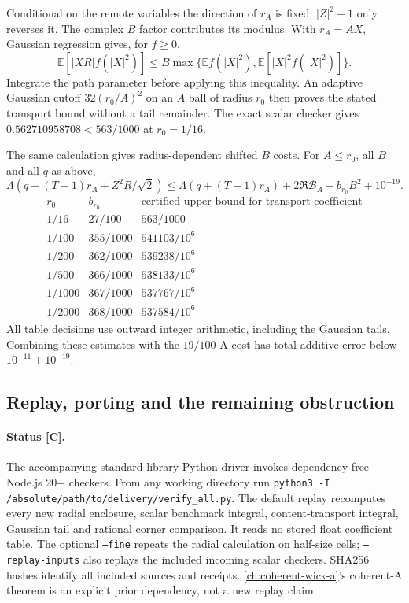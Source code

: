 Conditional on the remote variables the direction of $r_A$ is fixed;
$|Z|^2-1$ only reverses it. The complex $B$ factor contributes its
modulus. With $r_A=AX$, Gaussian regression gives, for $f\ge0$,
\[
 \mathbb E[|XR|f(|X|^2)]
 \le B\max\{\mathbb Ef(|X|^2),\mathbb E[|X|^2f(|X|^2)]\}.
\]
Integrate the path parameter before applying this inequality. An
adaptive Gaussian cutoff $32(r_0/A)^2$ on an $A$ ball of radius $r_0$
then proves the stated transport bound without a tail remainder.
The exact scalar checker gives $0.562710958708<563/1000$ at $r_0=1/16$.

The same calculation gives radius-dependent shifted $B$ costs. For
$A\le r_0$, all $B$ and all $q$ as above,
\[
 \Lambda(q+(T-1)r_A+Z^2R/\sqrt2)
 \le\Lambda(q+(T-1)r_A)+2\Re\mathcal B_A-b_{r_0} B^2+10^{-19}.
\]
\[
\begin{array}{c|c|c}
 r_0&b_{r_0}&\text{certified upper bound for transport coefficient}\\\hline
 1/16&27/100&563/1000\\
 1/100&355/1000&541103/10^6\\
 1/200&362/1000&539238/10^6\\
 1/500&366/1000&538133/10^6\\
 1/1000&367/1000&537767/10^6\\
 1/2000&368/1000&537584/10^6
\end{array}
\]
All table decisions use outward integer arithmetic, including the
Gaussian tails. Combining these estimates with the $19/100$ A cost
has total additive error below $10^{-11}+10^{-19}$.

\subsection{Replay, porting and the remaining obstruction}
\paragraph{Status [C].}
The accompanying standard-library Python driver invokes dependency-free
Node.js 20+ checkers. From any working directory run
\texttt{python3 -I /absolute/path/to/delivery/verify\_all.py}.
The default replay recomputes every new radial enclosure, scalar
benchmark integral, content-transport integral, Gaussian tail and
rational corner comparison. It reads no stored float coefficient table.
The optional \texttt{--fine} repeats the radial calculation on half-size
cells; \texttt{--replay-inputs} also replays the included incoming scalar
checkers. SHA256 hashes identify all included sources and receipts.
\autoref{ch:coherent-wick-a}'s coherent-A theorem is an explicit prior dependency, not a
new replay claim.

